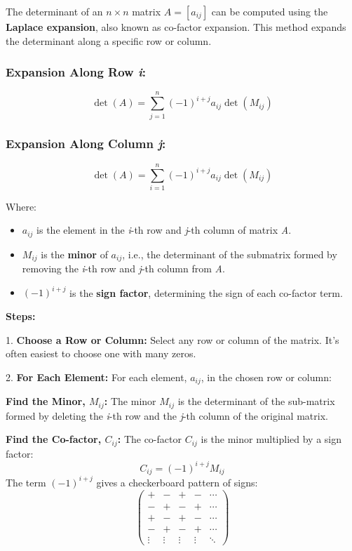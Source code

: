 The determinant of an \( n \times n \) matrix \( A = [a_{ij}] \) can be 
computed using the \textbf{Laplace expansion}, also known as co-factor expansion. 
This method expands the determinant along a specific row or column.

\subsubsection*{Expansion Along Row \emph{i}:}

\[
\det(A) = \sum_{j=1}^{n} {(-1)}^{i+j} a_{ij} \det(M_{ij})
\]

\subsubsection*{Expansion Along Column \emph{j}:}

\[
\det(A) = \sum_{i=1}^{n} {(-1)}^{i+j} a_{ij} \det(M_{ij})
\]

Where:

\begin{itemize}
    \item \( a_{ij} \) is the element in the \emph{i}-th row and \emph{j}-th column of matrix \emph{A}.
    \item \( M_{ij} \) is the \textbf{minor} of \( a_{ij} \), i.e., the determinant of the submatrix formed by removing the \emph{i}-th row and \emph{j}-th column from \emph{A}.
    \item \( {(-1)}^{i+j} \) is the \textbf{sign factor}, determining the sign of each co-factor term.
\end{itemize}

\textbf{Steps:}

1.\textbf{ Choose a Row or Column:} Select any row or column of the matrix.  It's often easiest to choose one with many zeros.

 2.\textbf{ For Each Element:} For each element, \(a_{ij}\), in the chosen row or column:

    \textbf{Find the Minor, \(M_{ij}\):} The minor \(M_{ij}\) is the determinant of the sub-matrix formed by deleting the 
    \indent \emph{i}-th row and the \emph{j}-th column of the original matrix.

    \textbf{Find the Co-factor, \(C_{ij}\):} The co-factor \(C_{ij}\) is the minor multiplied by a sign factor:
        \[
        C_{ij} = {(-1)}^{i+j} M_{ij}
        \]
        The term  \({(-1)}^{i+j}\)  gives a checkerboard pattern of signs:
        \[
        \begin{pmatrix}
        + & - & + & - & \cdots \\
        - & + & - & + & \cdots \\
        + & - & + & - & \cdots \\
        - & + & - & + & \cdots \\
        \vdots & \vdots & \vdots & \vdots & \ddots
        \end{pmatrix}
        \]

